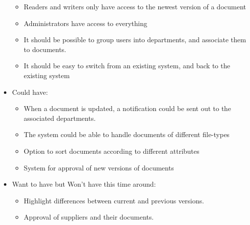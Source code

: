 \begin{itemize}
\begin{itemize}
            \item
            Readers and writers only have access to the newest version of a document
            \item
            Administrators have access to everything
            \item
            It should be possible to group users into departments, and associate them to documents.
            \item
            It should be easy to switch from an existing system, and back to the existing system
        \end{itemize}
    \item
    Could have:
        \begin{itemize}
            \item
            When a document is updated, a notification could be sent out to the associated departments.
            \item
            The system could be able to handle documents of different file-types
            \item
            Option to sort documents according to different attributes
            \item
            System for approval of new versions of documents
        \end{itemize}
    \item
    Want to have but Won't have this time around:
        \begin{itemize}
            \item
            Highlight differences between current and previous versions.
            \item
            Approval of suppliers and their documents.
        \end{itemize}
\end{itemize}

